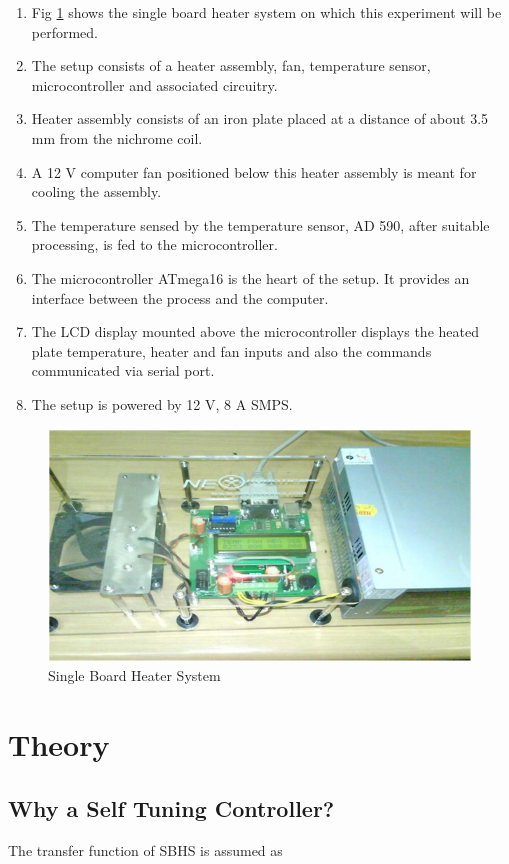\begin{enumerate}
	\item Fig \ref{sbsh} shows the single board heater system on which this experiment will be performed.
	\item The setup consists of a heater assembly, fan, temperature sensor, microcontroller and associated circuitry.
	\item Heater assembly consists of an iron plate placed at a distance of about 3.5 mm from the nichrome coil.
	\item A 12 V computer fan positioned below this heater assembly is meant for cooling the assembly.
	\item The temperature sensed by the temperature sensor, AD 590, after suitable processing, is fed to the microcontroller.
	\item The microcontroller ATmega16 is the heart of the setup. It provides an interface between the process and the computer.
	\item The LCD display mounted above the microcontroller displays the heated plate temperature, heater and fan inputs and also the commands communicated via serial port.
	\item The setup is powered by 12 V, 8 A SMPS.
	
\end{enumerate}
\begin{figure}[h]
	\centering
		\includegraphics[scale = 20, width = \linewidth]{Vikas_self/report_tex/sbsh.jpg}
	\caption{Single Board Heater System}
	\label{sbsh}
\end{figure}


\section{Theory}
\subsection{Why a Self Tuning Controller?}
The transfer function of SBHS is assumed as 


